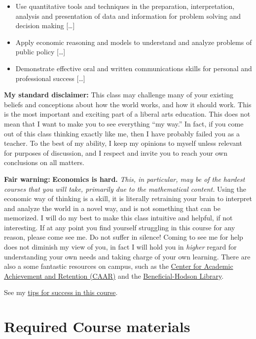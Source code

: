 \documentclass{article}
\providecommand{\tightlist}{%
  \setlength{\itemsep}{0pt}\setlength{\parskip}{0pt}}
\begin{document}
\begin{itemize}
\tightlist
\item
  Use quantitative tools and techniques in the preparation,
  interpretation, analysis and presentation of data and information for
  problem solving and decision making {[}\ldots{]}
\item
  Apply economic reasoning and models to understand and analyze problems
  of public policy {[}\ldots{]}
\item
  Demonstrate effective oral and written communications skills for
  personal and professional success {[}\ldots{]}
\end{itemize}

\textbf{My standard disclaimer:} This class may challenge many of your
existing beliefs and conceptions about how the world works, and how it
should work. This is the most important and exciting part of a liberal
arts education. This does not mean that I want to make you to see
everything ``my way.'' In fact, if you come out of this class thinking
exactly like me, then I have probably failed you as a teacher. To the
best of my ability, I keep my opinions to myself unless relevant for
purposes of discussion, and I respect and invite you to reach your own
conclusions on all matters.

\textbf{Fair warning:} \textbf{Economics is hard.} \emph{This, in
particular, may be of the hardest courses that you will take, primarily
due to the mathematical content.} Using the economic way of thinking is
a skill, it is literally retraining your brain to interpret and analyze
the world in a novel way, and is not something that can be memorized. I
will do my best to make this class intuitive and helpful, if not
interesting. If at any point you find yourself struggling in this course
for any reason, please come see me. Do not suffer in silence! Coming to
see me for help does not diminish my view of you, in fact I will hold
you in \emph{higher} regard for understanding your own needs and taking
charge of your own learning. There are also a some fantastic resources
on campus, such as the
\href{http://www.hood.edu/campus-services/academic-services/index.html}{Center
for Academic Achievement and Retention (CAAR)} and the
\href{http://www.hood.edu/library/}{Beneficial-Hodson Library}.

See my
\href{http://microF20.classes.ryansafner.com/reference\#tips}{tips for
success in this course}.

\hypertarget{required-course-materials}{%
\section*{Required Course materials}\label{required-course-materials}}
\end{document}
